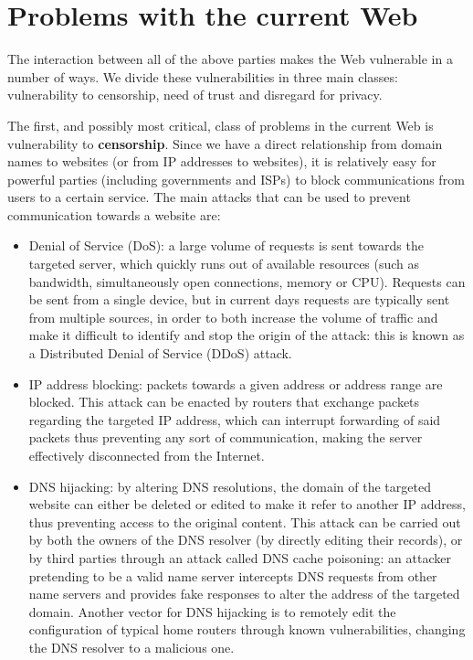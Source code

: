 \documentclass[mscthesis]{usiinfthesis}
\begin{document}
\section{Problems with the current Web} \label{sec:problems}
The interaction between all of the above parties makes the Web vulnerable in a number of ways. We divide these vulnerabilities in three main classes: vulnerability to censorship, need of trust and disregard for privacy.

The first, and possibly most critical, class of problems in the current Web is vulnerability to \textbf{censorship}. Since we have a direct relationship from domain names to websites (or from IP addresses to websites), it is relatively easy for powerful parties (including governments and ISPs) to block communications from users to a certain service.
The main attacks that can be used to prevent communication towards a website are:
\begin{itemize}
	\item Denial of Service (DoS): a large volume of requests is sent towards the targeted server, which quickly runs out of available resources (such as bandwidth, simultaneously open connections, memory or CPU). Requests can be sent from a single device, but in current days requests are typically sent from multiple sources, in order to both increase the volume of traffic and make it difficult to identify and stop the origin of the attack: this is known as a Distributed Denial of Service (DDoS) attack.
	\item IP address blocking: packets towards a given address or address range are blocked. This attack can be enacted by routers that exchange packets regarding the targeted IP address, which can interrupt forwarding of said packets thus preventing any sort of communication, making the server effectively disconnected from the Internet.
	\item DNS hijacking: by altering DNS resolutions, the domain of the targeted website can either be deleted or edited to make it refer to another IP address, thus preventing access to the original content. This attack can be carried out by both the owners of the DNS resolver (by directly editing their records), or by third parties through an attack called DNS cache poisoning: an attacker pretending to be a valid name server intercepts DNS requests from other name servers and provides fake responses to alter the address of the targeted domain. Another vector for DNS hijacking is to remotely edit the configuration of typical home routers through known vulnerabilities, changing the DNS resolver to a malicious one.
\end{itemize}
\end{document}
